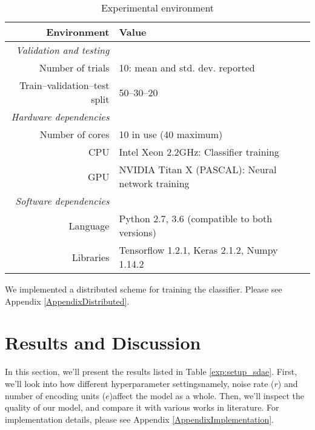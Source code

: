\begin{table}[t]
  \centering
  \caption{Experimental environment}
  \label{exp:implementation_sdae}
  \begin{threeparttable}
  \begin{tabular}{@{}rp{}@{}}
      \toprule
      Environment                    & Value                                             \\ \midrule
      \textit{Validation and testing}                                                    \\
      Number of trials               & 10: mean and std. dev. reported                   \\
      Train--validation--test split  & 50--30--20                                        \\ \cmidrule{1-2}
      \textit{Hardware dependencies}                                                     \\
      Number of cores\tnote{1}       & 10 in use (40 maximum)                            \\
      CPU                            & Intel Xeon 2.2GHz: Classifier training            \\
      GPU                            & NVIDIA Titan X (PASCAL): Neural network training  \\ \cmidrule{1-2} 
      \textit{Software dependencies}                                                     \\
      Language                & Python 2.7, 3.6 (compatible to both versions)            \\
      Libraries               & Tensorflow 1.2.1, Keras 2.1.2, Numpy 1.14.2              \\ \bottomrule
  \end{tabular}
  \begin{tablenotes}
    \footnotesize
    \item[1] We implemented a distributed scheme for training the classifier.
    Please see Appendix \ref{AppendixDistributed}.
  \end{tablenotes}
  \end{threeparttable}
\end{table}

\section{Results and Discussion}
\label{SDResults}

In this section, we'll present the results listed in Table
\ref{exp:setup_sdae}. First, we'll look into how different hyperparameter
settings\textemdash namely, noise rate ($r$) and number of encoding units
($e$)\textemdash affect the model as a whole. Then, we'll inspect the quality
of our model, and compare it with various works in literature.  For
implementation details, please see Appendix \ref{AppendixImplementation}.

